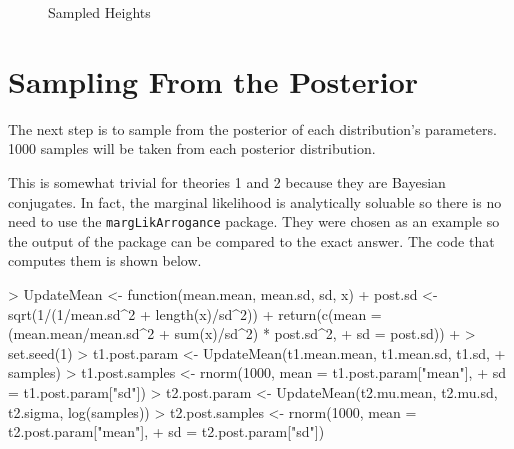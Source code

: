 \documentclass[letterpaper,12pt]{article}
\begin{document}
\begin{figure}[htp]
\begin{center}
 \caption{Sampled Heights} \label{height samples} \end{center}\end{figure}
\section{Sampling From the Posterior}

The next step is to sample from the posterior of each distribution's
parameters.  1000 samples will be taken from each posterior
distribution.

This is somewhat trivial for theories 1 and 2 because they are
Bayesian conjugates.  In fact, the marginal likelihood is analytically
soluable so there is no need to use the \texttt{margLikArrogance}
package.  They were chosen as an example so the output of the package
can be compared to the exact answer.  The code that computes them is
shown below.

\begin{Schunk}
\begin{Sinput}
> UpdateMean <- function(mean.mean, mean.sd, sd, x) {
+     post.sd <- sqrt(1/(1/mean.sd^2 + length(x)/sd^2))
+     return(c(mean = (mean.mean/mean.sd^2 + sum(x)/sd^2) * post.sd^2, 
+         sd = post.sd))
+ }
> set.seed(1)
> t1.post.param <- UpdateMean(t1.mean.mean, t1.mean.sd, t1.sd, 
+     samples)
> t1.post.samples <- rnorm(1000, mean = t1.post.param["mean"], 
+     sd = t1.post.param["sd"])
> t2.post.param <- UpdateMean(t2.mu.mean, t2.mu.sd, t2.sigma, log(samples))
> t2.post.samples <- rnorm(1000, mean = t2.post.param["mean"], 
+     sd = t2.post.param["sd"])
\end{Sinput}
\end{Schunk}
\end{document}
